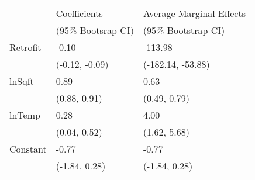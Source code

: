 \begin{tabular}{lll}
\toprule
{} &      Coefficients & Average Marginal Effects \\
{} & (95\% Bootsrap CI) &       (95\% Bootstrap CI) \\
\midrule
Retrofit &             -0.10 &                  -113.98 \\
         &    (-0.12, -0.09) &        (-182.14, -53.88) \\
lnSqft   &              0.89 &                     0.63 \\
         &      (0.88, 0.91) &             (0.49, 0.79) \\
lnTemp   &              0.28 &                     4.00 \\
         &      (0.04, 0.52) &             (1.62, 5.68) \\
Constant &             -0.77 &                    -0.77 \\
         &     (-1.84, 0.28) &            (-1.84, 0.28) \\
\bottomrule
\end{tabular}

